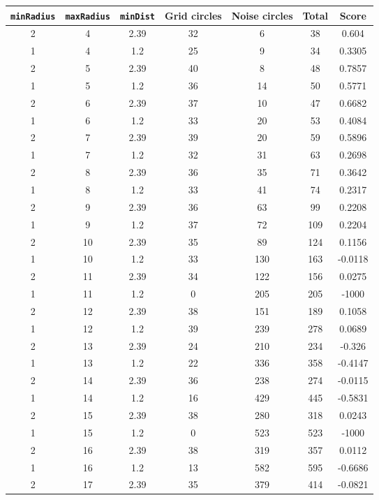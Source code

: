 \documentclass[letterpaper, 12pt]{article}
\begin{document}
\begin{longtable}{|c|c|c|c|c|c|c|}
\hline
\textbf{\texttt{minRadius}} & \textbf{\texttt{maxRadius}} & \textbf{\texttt{minDist}} & \textbf{Grid circles} & \textbf{Noise circles} & \textbf{Total} & \textbf{Score} \\
\hline
2 & 4 & 2.39 & 32 & 6 & 38 & 0.604 \\
\hline
1 & 4 & 1.2 & 25 & 9 & 34 & 0.3305 \\
\hline
2 & 5 & 2.39 & 40 & 8 & 48 & 0.7857 \\
\hline
1 & 5 & 1.2 & 36 & 14 & 50 & 0.5771 \\
\hline
2 & 6 & 2.39 & 37 & 10 & 47 & 0.6682 \\
\hline
1 & 6 & 1.2 & 33 & 20 & 53 & 0.4084 \\
\hline
2 & 7 & 2.39 & 39 & 20 & 59 & 0.5896 \\
\hline
1 & 7 & 1.2 & 32 & 31 & 63 & 0.2698 \\
\hline
2 & 8 & 2.39 & 36 & 35 & 71 & 0.3642 \\
\hline
1 & 8 & 1.2 & 33 & 41 & 74 & 0.2317 \\
\hline
2 & 9 & 2.39 & 36 & 63 & 99 & 0.2208 \\
\hline
1 & 9 & 1.2 & 37 & 72 & 109 & 0.2204 \\
\hline
2 & 10 & 2.39 & 35 & 89 & 124 & 0.1156 \\
\hline
1 & 10 & 1.2 & 33 & 130 & 163 & -0.0118 \\
\hline
2 & 11 & 2.39 & 34 & 122 & 156 & 0.0275 \\
\hline
1 & 11 & 1.2 & 0 & 205 & 205 & -1000 \\
\hline
2 & 12 & 2.39 & 38 & 151 & 189 & 0.1058 \\
\hline
1 & 12 & 1.2 & 39 & 239 & 278 & 0.0689 \\
\hline
2 & 13 & 2.39 & 24 & 210 & 234 & -0.326 \\
\hline
1 & 13 & 1.2 & 22 & 336 & 358 & -0.4147 \\
\hline
2 & 14 & 2.39 & 36 & 238 & 274 & -0.0115 \\
\hline
1 & 14 & 1.2 & 16 & 429 & 445 & -0.5831 \\
\hline
2 & 15 & 2.39 & 38 & 280 & 318 & 0.0243 \\
\hline
1 & 15 & 1.2 & 0 & 523 & 523 & -1000 \\
\hline
2 & 16 & 2.39 & 38 & 319 & 357 & 0.0112 \\
\hline
1 & 16 & 1.2 & 13 & 582 & 595 & -0.6686 \\
\hline
2 & 17 & 2.39 & 35 & 379 & 414 & -0.0821 \\

\end{longtable}
\end{document}
